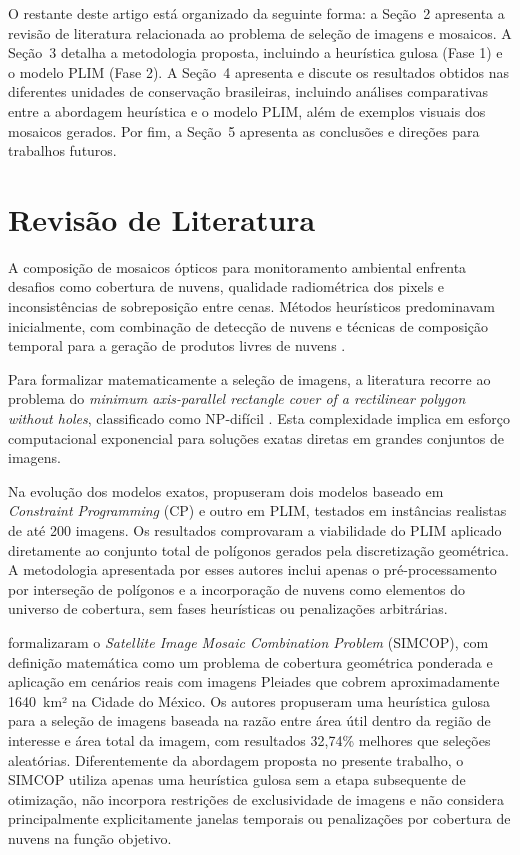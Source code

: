 \documentclass[a4paper,11pt]{article}
\begin{document}
O restante deste artigo está organizado da seguinte forma: a Seção~2 apresenta a revisão de literatura relacionada ao problema de seleção de imagens e mosaicos. A Seção~3 detalha a metodologia proposta, incluindo a heurística gulosa (Fase 1) e o modelo PLIM (Fase 2). A Seção~4 apresenta e discute os resultados obtidos nas diferentes unidades de conservação brasileiras, incluindo análises comparativas entre a abordagem heurística e o modelo PLIM, além de exemplos visuais dos mosaicos gerados. Por fim, a Seção~5 apresenta as conclusões e direções para trabalhos futuros.
\vspace{-6mm}
\section{Revisão de Literatura}
\vspace{-3mm}
A composição de mosaicos ópticos para monitoramento ambiental enfrenta desafios como cobertura de nuvens, qualidade radiométrica dos pixels e inconsistências de sobreposição entre cenas. Métodos heurísticos predominavam inicialmente, com combinação de detecção de nuvens e técnicas de composição temporal para a geração de produtos livres de nuvens \citep{kempeneers:2017}.

Para formalizar matematicamente a seleção de imagens, a literatura recorre ao problema do 
\emph{minimum axis-parallel rectangle cover of a rectilinear polygon without holes}, 
classificado como NP-difícil \citep{KumarRamesh1995, masek1978}. Esta complexidade implica em esforço computacional exponencial para soluções exatas diretas em grandes conjuntos de imagens.

Na evolução dos modelos exatos, \citet{combarro-simon-constraint-2023} propuseram dois modelos baseado em \textit{Constraint Programming} (CP) e outro em PLIM, testados em instâncias realistas de até 200 imagens. Os resultados comprovaram a viabilidade do PLIM aplicado diretamente ao conjunto total de polígonos gerados pela discretização geométrica. A metodologia apresentada por esses autores inclui apenas o pré-processamento por interseção de polígonos e a incorporação de nuvens como elementos do universo de cobertura, sem fases heurísticas ou penalizações arbitrárias.

\citet{combarro-simon-simcop:2023} formalizaram o \textit{Satellite Image Mosaic Combination Problem} (SIMCOP), com definição matemática como um problema de cobertura geométrica ponderada e aplicação em cenários reais com imagens Pleiades que cobrem aproximadamente 1640~km² na Cidade do México. Os autores propuseram uma heurística gulosa para a seleção de imagens baseada na razão entre área útil dentro da região de interesse e área total da imagem, com resultados 32,74\% melhores que seleções aleatórias. Diferentemente da abordagem proposta no presente trabalho, o SIMCOP utiliza apenas uma heurística gulosa sem a etapa subsequente de otimização, não incorpora restrições de exclusividade de imagens e não considera principalmente explicitamente janelas temporais ou penalizações por cobertura de nuvens na função objetivo.
\end{document}
